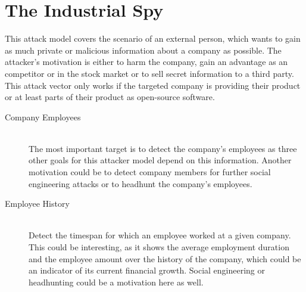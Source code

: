 \section{The Industrial Spy}\label{industrial-spy}
This attack model covers the scenario of an external person, which wants to gain as much private or malicious information about a company as possible.
The attacker's motivation is either to harm the company, gain an advantage as an competitor or in the stock market or to sell secret information to a third party.
This attack vector only works if the targeted company is providing their product or at least parts of their product as open-source software.

\begin{description}
    \item[Company Employees] \hfill \\
        The most important target is to detect the company's employees as three other goals for this attacker model depend on this information.
        Another motivation could be to detect company members for further social engineering attacks or to headhunt the company's employees.

    \item[Employee History] \hfill \\
        Detect the timespan for which an employee worked at a given company.
        This could be interesting, as it shows the average employment duration and the employee amount over the history of the company, which could be an indicator of its current financial growth.
        Social engineering or headhunting could be a motivation here as well.


\end{description}
